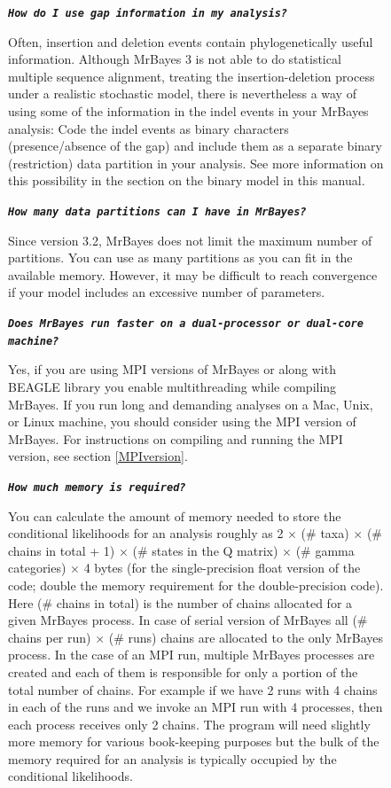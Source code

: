 \documentclass[12pt]{book}
\newcommand{\ttt}[1]{\texttt{#1}}
\newcommand{\tb}[1]{\ttt{\textbf{#1}}}
\begin{document}
\begin{figure}[h]
\tb{\it{How do I use gap information in my analysis?}}

Often, insertion and deletion events contain phylogenetically useful information. Although MrBayes
3 is not able to do statistical multiple sequence alignment, treating the insertion-deletion
process under a realistic stochastic model, there is nevertheless a way of using some of the
information in the indel events in your MrBayes analysis: Code the indel events as binary
characters (presence/absence of the gap) and include them as a separate binary (restriction) data
partition in your analysis. See more information on this possibility in the section on the binary
model in this manual.

\tb{\it{How many data partitions can I have in MrBayes?}}

Since version 3.2, MrBayes does not limit the maximum number of partitions. You can use as many
partitions as you can fit in the available memory. However, it may be difficult to reach
convergence if your model includes an excessive number of parameters.

\tb{\it{Does MrBayes run faster on a dual-processor or dual-core machine?}}

Yes, if you are using MPI versions of MrBayes or along with BEAGLE library you enable
multithreading while compiling MrBayes. If you run long and demanding analyses on a Mac, Unix, or
Linux machine, you should consider using the MPI version of MrBayes. For instructions on compiling
and running the MPI version, see section \ref{MPIversion}.

\tb{\it{How much memory is required?}}

You can calculate the amount of memory needed to store the conditional likelihoods for an analysis
roughly as 2 $\times$ (\# taxa) $\times$ (\# chains in total + 1) $\times$ (\# states in the Q
matrix) $\times$ (\# gamma categories) $\times$ 4 bytes (for the single-precision float version of
the code; double the memory requirement for the double-precision code). Here (\# chains in total)
is the number of chains allocated for a given MrBayes process. In case of serial version of MrBayes
all (\# chains per run) $\times$ (\# runs) chains are allocated to the only MrBayes process. In the case
of an MPI run, multiple MrBayes processes are created and each of them is responsible for only a
portion of the total number of chains. For example if we have 2 runs with 4 chains in each of the
runs and we invoke an MPI run with 4 processes, then each process receives only 2 chains. The
program will need slightly more memory for various book-keeping purposes but the bulk of the memory
required for an analysis is typically occupied by the conditional likelihoods.


\end{figure}
\end{document}
